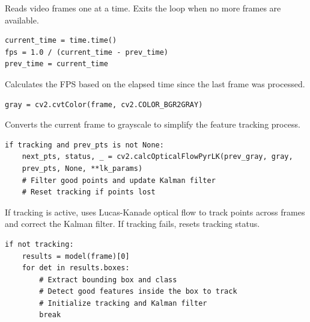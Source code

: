 \documentclass[a4paper,12pt]{article}
\begin{document}
Reads video frames one at a time. Exits the loop when no more frames are available.

\vspace{0.5em}
\begin{tcolorbox}[colback=lightgray!20, colframe=gray!80, title=FPS Computation]
\begin{verbatim}
current_time = time.time()
fps = 1.0 / (current_time - prev_time)
prev_time = current_time
\end{verbatim}
\end{tcolorbox}

Calculates the FPS based on the elapsed time since the last frame was processed.

\vspace{0.5em}
\begin{tcolorbox}[colback=lightgray!20, colframe=gray!80, title=Convert Frame to Grayscale]
\begin{verbatim}
gray = cv2.cvtColor(frame, cv2.COLOR_BGR2GRAY)
\end{verbatim}
\end{tcolorbox}

Converts the current frame to grayscale to simplify the feature tracking process.

\vspace{0.5em}
\begin{tcolorbox}[colback=lightgray!20, colframe=gray!80, title=Optical Flow Tracking]
\begin{verbatim}
if tracking and prev_pts is not None:
    next_pts, status, _ = cv2.calcOpticalFlowPyrLK(prev_gray, gray, 
    prev_pts, None, **lk_params)
    # Filter good points and update Kalman filter
    # Reset tracking if points lost
\end{verbatim}
\end{tcolorbox}

If tracking is active, uses Lucas-Kanade optical flow to track points across frames and correct the Kalman filter. If tracking fails, resets tracking status.

\vspace{0.5em}
\begin{tcolorbox}[colback=lightgray!20, colframe=gray!80, title=Object Detection and Initialization]
\begin{verbatim}
if not tracking:
    results = model(frame)[0]
    for det in results.boxes:
        # Extract bounding box and class
        # Detect good features inside the box to track
        # Initialize tracking and Kalman filter
        break
\end{verbatim}
\end{tcolorbox}
\end{document}
